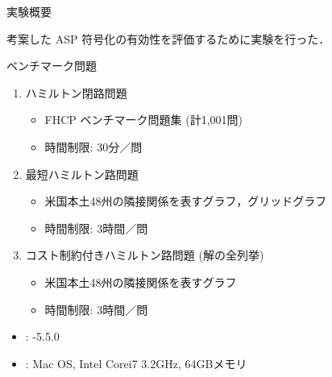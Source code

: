 \documentclass[dvipdfmx]{beamer}
\begin{document}
\begin{frame}{実験概要}
\begin{block}{}\centering
  考案した ASP 符号化の有効性を評価するために実験を行った．
\end{block}
\vfill

\begin{exampleblock}{ベンチマーク問題}
  \begin{enumerate}
  \item \alert{ハミルトン閉路問題}
    \begin{itemize}
    \item FHCP ベンチマーク問題集 (計1,001問)
    \item 時間制限: 30分／問
    \end{itemize}
  \item 最短ハミルトン路問題
    \begin{itemize}
    \item 米国本土48州の隣接関係を表すグラフ，グリッドグラフ
    \item 時間制限: 3時間／問
    \end{itemize}
  \item コスト制約付きハミルトン路問題 (解の全列挙)
    \begin{itemize}
  \item 米国本土48州の隣接関係を表すグラフ
    \item 時間制限: 3時間／問
    \end{itemize}
    \end{enumerate}
\end{exampleblock}

\begin{itemize}
  \item {}: {\clingo}-5.5.0
  \item {}: Mac OS, Intel Corei7 3.2GHz, 64GBメモリ
\end{itemize}

\end{frame}
\end{document}

